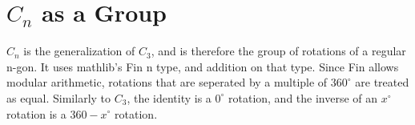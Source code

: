 \section{$C_n$ as a Group}

\begin{definition}[$C_n$]
    \label{definition : Cn}
    \leanok
    $C_n$ is the generalization of $C_3$, and is therefore the group of
    rotations of a regular n-gon. It uses mathlib's Fin n type, and addition on
    that type. Since Fin allows modular arithmetic, rotations that are seperated
    by a multiple of $360 ^{\circ}$ are treated as equal. Similarly to $C_3$,
    the identity is a $0 ^{\circ}$ rotation, and the inverse of an $x ^{\circ}$
    rotation is a $360 - x ^{\circ}$ rotation.
\end{definition}
